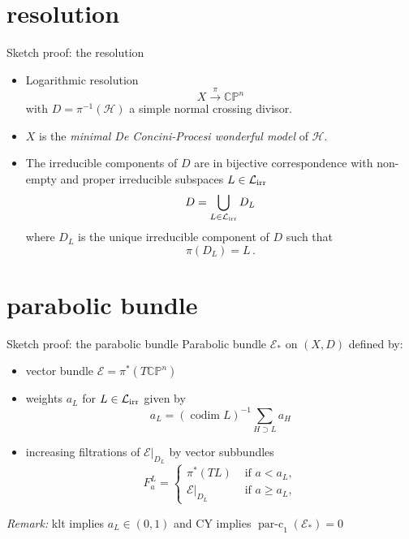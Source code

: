 \documentclass{beamer}
\newcommand{\CP}{\mathbb{CP}}
\newcommand{\mE}{\mathcal{E}}
\newcommand{\mH}{\mathcal{H}}
\newcommand{\mLi}{\mathcal{L}_{\textup{irr}}}
\DeclareMathOperator{\codim}{codim}
\DeclareMathOperator{\parc}{par-c}
\begin{document}
\section{resolution}
\begin{frame}{Sketch proof: the resolution}
	\begin{itemize}
		\item Logarithmic resolution
		\[
		X \xrightarrow{\pi} \CP^n
		\]
		with \(D = \pi^{-1}(\mH)\) a simple normal crossing divisor.
		
		\item \(X\) is the \emph{minimal De Concini-Procesi wonderful model} of \(\mH\). 
		
		\item The irreducible components of \(D\) are in bijective correspondence with non-empty and proper irreducible subspaces \(L \in \mLi\) 
		\[
		D = \bigcup_{L \in \mLi} D_L
		\]
		where \(D_L\) is the unique irreducible component of \(D\) such that 
		\[
		\pi(D_L) = L \,.
		\]
		
	\end{itemize}
\end{frame}

\section{parabolic bundle}
\begin{frame}{Sketch proof: the parabolic bundle}
	Parabolic bundle \(\mE_{*}\) on \((X,D)\) defined by:
	\begin{itemize}
		\item vector bundle \(\mE = \pi^*(T\CP^n)\)
		\item weights \(a_L\) for \(L \in \mLi\) given by
		\[
		a_L = (\codim L)^{-1} \sum_{H \supset L} a_H 
		\]
		\item increasing filtrations of \(\mE|_{D_L}\) by vector subbundles 
		\begin{equation*}
		F^L_a = 
		\begin{cases}
		\pi^*(TL) &\text{ if } a < a_L, \\
		\mE|_{D_L} &\text{ if } a \geq a_L ,
		\end{cases}
		\end{equation*}	
	\end{itemize}
\emph{Remark:} klt implies \(a_L \in (0,1)\) and 
CY implies \(\parc_1(\mE_{*}) = 0\)
\end{frame}
\end{document}
